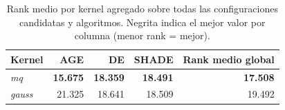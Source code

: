 \begin{table}[H]
    \centering
    \small
    \setlength{\tabcolsep}{5pt}
    \begin{tabular}{lrrr|r}
        \toprule
        \textbf{Kernel} & \textbf{AGE} & \textbf{DE} & \textbf{SHADE} & \textbf{Rank medio global} \\
        \midrule
        \textit{mq} & \textbf{15.675} & \textbf{18.359} & \textbf{18.491} & \textbf{17.508} \\
        \textit{gauss} & 21.325 & 18.641 & 18.509 & 19.492 \\
        \bottomrule
    \end{tabular}
    \caption{Rank medio por kernel agregado sobre todas las configuraciones candidatas y algoritmos. Negrita indica el mejor valor por columna (menor rank = mejor).}
    \label{tab:rbf_seleccion_kernel}
\end{table}
